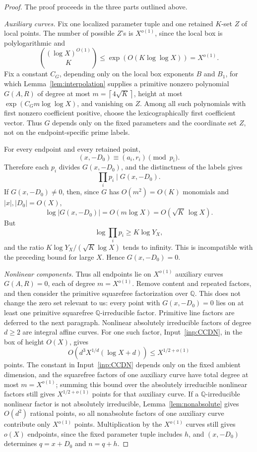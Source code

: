 \documentclass[11pt]{article}
\theoremstyle{definition}
\newcommand{\Q}{\mathbb Q}
\newcommand{\ceil}[1]{\left\lceil #1\right\rceil}
\newcommand{\1}{\mathbf 1}
\begin{document}
\begin{proof}
The proof proceeds in the three parts outlined above.

\smallskip
\noindent\emph{Auxiliary curves.}
Fix one localized parameter tuple and one retained \(K\)-set \(Z\) of local
points.  The number of possible \(Z\)'s is \(X^{o(1)}\), since the local box is
polylogarithmic and
\[
  \binom{(\log X)^{O(1)}}{K}\le\exp(O(K\log\log X))=X^{o(1)}.
\]
Fix a constant \(C_G\), depending only on the local box exponents \(B\) and
\(B_1\), for
which Lemma~\ref{lem:interpolation} supplies a primitive nonzero polynomial
\(G(A,R)\) of degree at most \(m=\ceil{4\sqrt K}\), height at most
\(\exp(C_Gm\log\log X)\), and vanishing on \(Z\).  Among all such polynomials
with first nonzero coefficient positive, choose the lexicographically first
coefficient vector.  Thus \(G\) depends only on the fixed parameters and the
coordinate set \(Z\), not on the endpoint-specific prime labels.

For every endpoint and every retained point,
\[
  (x,-D_0)\equiv (a_i,r_i)\pmod {p_i}.
\]
Therefore each \(p_i\) divides \(G(x,-D_0)\), and the distinctness of the labels
gives
\[
  \prod_i p_i\mid G(x,-D_0).
\]
If \(G(x,-D_0)\ne0\), then, since \(G\) has \(O(m^2)=O(K)\) monomials and
\(|x|,|D_0|=O(X)\),
\[
  \log |G(x,-D_0)|=O(m\log X)=O(\sqrt K\,\log X).
\]
But
\[
  \log\prod_i p_i\ge K\log Y_X,
\]
and the ratio \(K\log Y_X/(\sqrt K\log X)\) tends to infinity.  This is
incompatible with the preceding bound for large \(X\).  Hence
\(G(x,-D_0)=0\).

\smallskip
\noindent\emph{Nonlinear components.}
Thus all endpoints lie on \(X^{o(1)}\) auxiliary curves \(G(A,R)=0\), each of
degree \(m=X^{o(1)}\).  Remove content and repeated factors, and then consider
the primitive squarefree factorization over \(\Q\).  This does not change the
zero set relevant to us: every point with \(G(x,-D_0)=0\) lies on at least one
primitive squarefree \(\Q\)-irreducible factor.  Primitive line factors are
deferred to the next paragraph.  Nonlinear absolutely irreducible factors of
degree \(d\ge2\) are integral affine curves.  For one such factor,
Input~\ref{inp:CCDN}, in the box of height \(O(X)\), gives
\[
  O(d^3X^{1/d}(\log X+d))\le X^{1/2+o(1)}
\]
points.  The constant in Input~\ref{inp:CCDN} depends only on the fixed ambient
dimension, and the squarefree factors of one auxiliary curve have total degree
at most \(m=X^{o(1)}\); summing this bound over the absolutely irreducible
nonlinear factors still gives \(X^{1/2+o(1)}\) points for that auxiliary curve.
If a \(\Q\)-irreducible nonlinear factor is not absolutely irreducible,
Lemma~\ref{lem:nonabsolute} gives \(O(d^2)\) rational points, so all
nonabsolute factors of one auxiliary curve contribute only \(X^{o(1)}\) points.
Multiplication by the \(X^{o(1)}\) curves still gives \(o(X)\) endpoints, since
the fixed parameter tuple includes \(h\), and \((x,-D_0)\) determines
\(q=x+D_0\) and \(n=q+h\).


\end{proof}
\end{document}
